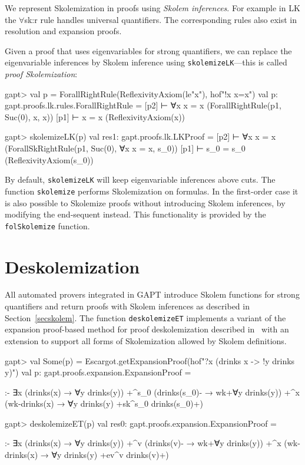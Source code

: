 \documentclass[a4paper,11pt]{book}
\begin{document}
We represent Skolemization in proofs using \emph{Skolem inferences}.  For
example in LK the $\forall$sk:r rule handles universal quantifiers.  The
corresponding rules also exist in resolution and expansion proofs.
\begin{prooftree}
\end{prooftree}

Given a proof that uses eigenvariables for strong quantifiers, we can replace
the eigenvariable inferences by Skolem inference using
\texttt{skolemizeLK}---this is called \emph{proof Skolemization}:
\begin{clilisting}
gapt> val p = ForallRightRule(ReflexivityAxiom(le"x"), hof"!x x=x")
val p: gapt.proofs.lk.rules.ForallRightRule =
[p2]  ⊢ ∀x x = x    (ForallRightRule(p1, Suc(0), x, x))
[p1]  ⊢ x = x    (ReflexivityAxiom(x))

gapt> skolemizeLK(p)
val res1: gapt.proofs.lk.LKProof =
[p2]  ⊢ ∀x x = x    (ForallSkRightRule(p1, Suc(0), ∀x x = x, s_0))
[p1]  ⊢ s_0 = s_0    (ReflexivityAxiom(s_0))

\end{clilisting}

By default, \texttt{skolemizeLK} will keep eigenvariable inferences above cuts.
The function \texttt{skolemize} performs Skolemization on formulas.
In the first-order case it is also possible to Skolemize proofs without
introducing Skolem inferences, by modifying the end-sequent instead.  This
functionality is provided by the \texttt{folSkolemize} function.

\section{Deskolemization}

All automated provers integrated in GAPT introduce Skolem functions for strong
quantifiers and return proofs with Skolem inferences as described in
Section~\ref{secskolem}.  The function \texttt{deskolemizeET} implements a
variant of the expansion proof-based method for proof deskolemization
described in~\cite{Baaz2012Complexity} with an extension to support all forms
of Skolemization allowed by Skolem definitions.
\begin{clilisting}
gapt> val Some(p) = Escargot.getExpansionProof(hof"?x (drinks x -> !y drinks y)")
val p: gapt.proofs.expansion.ExpansionProof =

:-
∃x (drinks(x) → ∀y drinks(y))
  +^{s_0} (drinks(s_0)- → wk+{∀y drinks(y)})
  +^{x} (wk-{drinks(x)} → ∀y drinks(y) +sk^{s_0} drinks(s_0)+)

gapt> deskolemizeET(p)
val res0: gapt.proofs.expansion.ExpansionProof =

:-
∃x (drinks(x) → ∀y drinks(y))
  +^{v} (drinks(v)- → wk+{∀y drinks(y)})
  +^{x} (wk-{drinks(x)} → ∀y drinks(y) +ev^{v} drinks(v)+)

\end{clilisting}
\end{document}
